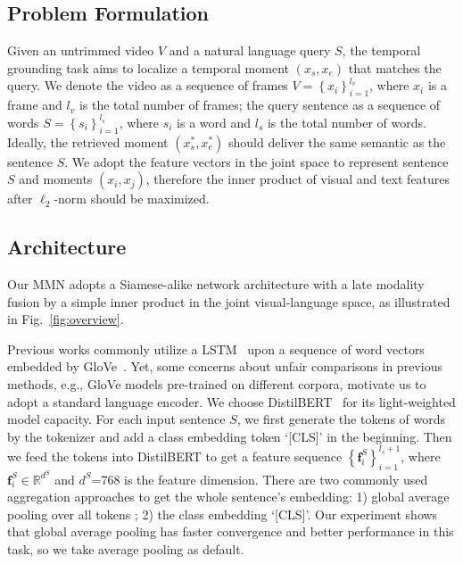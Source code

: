 \documentclass[letterpaper]{article} \usepackage{aaai22}  \usepackage{times}  \usepackage{helvet}  \usepackage{courier}  \usepackage[hyphens]{url}  \usepackage{graphicx} \urlstyle{rm} \def\UrlFont{\rm}  \usepackage{natbib}  \usepackage{caption} \DeclareCaptionStyle{ruled}{labelfont=normalfont,labelsep=colon,strut=off} \frenchspacing  \setlength{\pdfpagewidth}{8.5in}  \setlength{\pdfpageheight}{11in}  \usepackage{algorithm}
\begin{document}
\subsection{Problem Formulation}
\label{sec:task}
Given an untrimmed video $V$ and a natural language query $S$, the temporal grounding task aims to localize a temporal moment $(x_s, x_e)$ that matches the query. We denote the video as a sequence of frames $V=\left\{x_{i}\right\}_{i=1}^{l_{v}}$, where $x_i$ is a frame and $l_v$ is the total number of frames; the query sentence as a sequence of words $S=\left\{s_{i}\right\}_{i=1}^{l_{s}}$, where $s_i$ is a word and $l_s$ is the total number of words. Ideally, the retrieved moment $(x_s^*, x_e^*)$ should deliver the same semantic as the sentence $S$. We adopt the feature vectors in the joint space to represent sentence $S$ and moments $(x_i, x_j)$, therefore the inner product of visual and text features after $\ell_2$-norm should be maximized.

\subsection{Architecture}
\label{sec:arch}
Our MMN adopts a Siamese-alike network architecture with a late modality fusion by a simple inner product in the joint visual-language space, as illustrated in Fig.~\ref{fig:overview}.

 Previous works commonly utilize a LSTM~\cite{DBLP:journals/neco/HochreiterS97} upon a sequence of word vectors embedded by GloVe~\cite{DBLP:conf/emnlp/PenningtonSM14}. Yet, some concerns about unfair comparisons in previous methods, e.g., GloVe models pre-trained on different corpora, motivate us to adopt a standard language encoder. We choose DistilBERT~\cite{DBLP:journals/corr/abs-1910-01108} for its light-weighted model capacity. For each input sentence $S$, we first generate the tokens of words by the tokenizer and add a class embedding token `[CLS]' in the beginning. Then we feed the tokens into DistilBERT to get a feature sequence $\left\{\mathbf{f}^S_{i}\right\}_{i=1}^{l_s + 1}$, where $\mathbf{f}^S_{i} \in \mathbb{R}^{d^S}$ and $d^S$=768 is the feature dimension. There are two commonly used aggregation approaches to get the whole sentence's embedding: 1) global average pooling over all tokens
; 2) the class embedding `[CLS]'. Our experiment shows that global average pooling has faster convergence and better performance in this task, so we take average pooling as default. 
\end{document}

